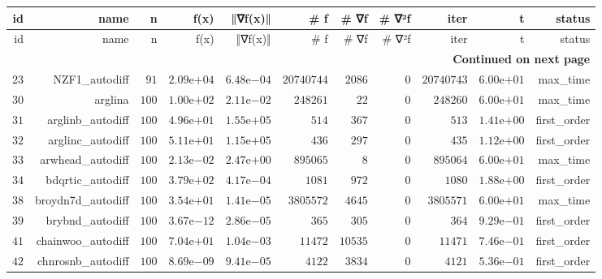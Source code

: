 \documentclass[varwidth=20cm,crop=true]{standalone}
\begin{document}
\begin{longtable}{rrrrrrrrrrr}
  \hline
  id & name & n & f(x) & ‖∇f(x)‖ & # f & # ∇f & # ∇²f & iter & t & status \\\hline
  \endfirsthead
  \hline
  id & name & n & f(x) & ‖∇f(x)‖ & # f & # ∇f & # ∇²f & iter & t & status \\\hline
  \endhead
  \hline
  \multicolumn{11}{r}{{\bfseries Continued on next page}}\\
  \hline
  \endfoot
  \endlastfoot
  \(    23\) & NZF1\_autodiff & \(    91\) & \( 2.09\)e\(+04\) & \( 6.48\)e\(-04\) & \(20740744\) & \(  2086\) & \(     0\) & \(20740743\) & \( 6.00\)e\(+01\) & max\_time \\
  \(    30\) & arglina & \(   100\) & \( 1.00\)e\(+02\) & \( 2.11\)e\(-02\) & \(248261\) & \(    22\) & \(     0\) & \(248260\) & \( 6.00\)e\(+01\) & max\_time \\
  \(    31\) & arglinb\_autodiff & \(   100\) & \( 4.96\)e\(+01\) & \( 1.55\)e\(+05\) & \(   514\) & \(   367\) & \(     0\) & \(   513\) & \( 1.41\)e\(+00\) & first\_order \\
  \(    32\) & arglinc\_autodiff & \(   100\) & \( 5.11\)e\(+01\) & \( 1.15\)e\(+05\) & \(   436\) & \(   297\) & \(     0\) & \(   435\) & \( 1.12\)e\(+00\) & first\_order \\
  \(    33\) & arwhead\_autodiff & \(   100\) & \( 2.13\)e\(-02\) & \( 2.47\)e\(+00\) & \(895065\) & \(     8\) & \(     0\) & \(895064\) & \( 6.00\)e\(+01\) & max\_time \\
  \(    34\) & bdqrtic\_autodiff & \(   100\) & \( 3.79\)e\(+02\) & \( 4.17\)e\(-04\) & \(  1081\) & \(   972\) & \(     0\) & \(  1080\) & \( 1.88\)e\(+00\) & first\_order \\
  \(    38\) & broydn7d\_autodiff & \(   100\) & \( 3.54\)e\(+01\) & \( 1.41\)e\(-05\) & \(3805572\) & \(  4645\) & \(     0\) & \(3805571\) & \( 6.00\)e\(+01\) & max\_time \\
  \(    39\) & brybnd\_autodiff & \(   100\) & \( 3.67\)e\(-12\) & \( 2.86\)e\(-05\) & \(   365\) & \(   305\) & \(     0\) & \(   364\) & \( 9.29\)e\(-01\) & first\_order \\
  \(    41\) & chainwoo\_autodiff & \(   100\) & \( 7.04\)e\(+01\) & \( 1.04\)e\(-03\) & \( 11472\) & \( 10535\) & \(     0\) & \( 11471\) & \( 7.46\)e\(-01\) & first\_order \\
  \(    42\) & chnrosnb\_autodiff & \(   100\) & \( 8.69\)e\(-09\) & \( 9.41\)e\(-05\) & \(  4122\) & \(  3834\) & \(     0\) & \(  4121\) & \( 5.36\)e\(-01\) & first\_order \\

\end{longtable}
\end{document}
